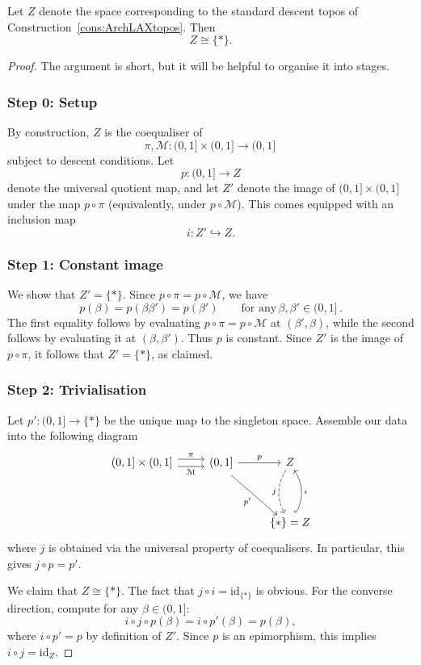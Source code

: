 \documentclass[a4paper, 11pt,reqno]{amsart}
\newcommand{\id}{\mathrm{id}}
\newcommand{\M}{\mathcal{M}}
\begin{document}
\begin{observation}\label{obs:grpcompletion}
	Let $Z$ denote the space corresponding to the standard descent topos of
	Construction~\ref{cons:ArchLAXtopos}. Then
	\[
	Z\cong\{*\}.
	\]
\end{observation}
\begin{proof} The argument is short, but it will be helpful to organise it into stages.
	
\subsubsection*{Step 0: Setup} By construction, $Z$ is the coequaliser of $$\pi,\M\colon (0,1]\times (0,1] \to (0,1]\,$$
subject to descent conditions. Let
$$p\colon (0,1]\to Z$$
denote the universal quotient map, and let $Z'$ denote the image of $(0,1]\times(0,1]$ under the map
$p\circ\pi$ (equivalently, under $p\circ\M$). This comes equipped with an inclusion map
\[
i\colon Z'\hookrightarrow Z.
\]
\subsubsection*{Step 1: Constant image} We show that $Z'=\{\ast\}$. Since $p\circ\pi=p\circ\M$, we have
\[
p(\beta)
=
p(\beta\beta')
=
p(\beta') \qquad\text{for any}\, \beta,\beta'\in(0,1]\,.
\]
The first equality follows by evaluating
$p\circ\pi=p\circ\M$ at $(\beta',\beta)$, while the second follows by
evaluating it at $(\beta,\beta')$. Thus $p$ is constant. Since $Z'$ is the image of $p\circ\pi$, it follows that $Z'=\{*\}$, as claimed.


\subsubsection*{Step 2: Trivialisation}

Let $p'\colon(0,1]\to\{*\}$ be the unique map to the singleton space. Assemble our data into the following diagram
\begin{equation}
\begin{tikzcd}
(0,1] \times (0,1] \ar[r,shift left=.75ex,"\pi"]
\ar[r,shift right=.75ex,swap,"\M"]
&
(0,1] \ar[r,"p"] \ar[ddr,swap, shift right=1,"p'"] 
& Z \ar[dd,  bend right, swap,dashed,"j"]\\
\\
& & \{*\}= Z \ar[uu,hook, bend right, swap,"i"]
\end{tikzcd}
\end{equation}
where $j$ is obtained via the universal property of coequalisers. In particular, this gives $j\circ p = p'$.

We claim that $Z\cong\{*\}$. The fact that $j\circ i=\id_{\{*\}}$ is obvious. For the converse direction, compute for any $\beta\in(0,1]$:
\[i\circ j\circ p(\beta)=i\circ p'(\beta)= p(\beta),\]	
where $i\circ p'=p$ by definition of $Z'$. Since $p$ is an epimorphism, this implies $i\circ j =\id_{Z}$.
\end{proof}
\end{document}
